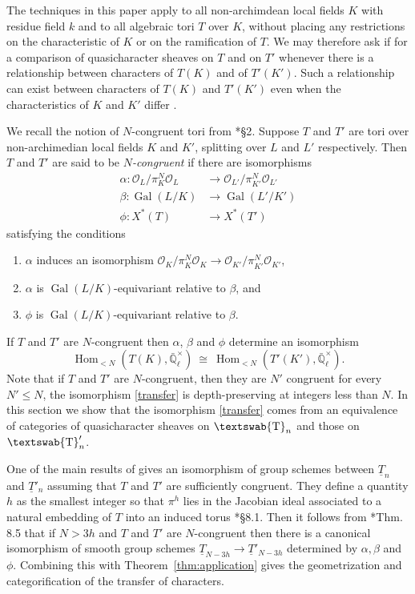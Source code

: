 \documentclass[11pt]{amsart}
\newcommand{\mathswab}[1]{\operatorname{\textswab{#1}}}
\theoremstyle{plain}
\theoremstyle{definition}
\theoremstyle{remark}
\newcommand{\EE}{\mathbb{\bar Q}_\ell}
\newcommand{\OK}{\mathcal{O}_K}
\newcommand{\OL}{\mathcal{O}_L}
\newcommand{\OO}[1]{\mathcal{O}_{#1}}
\newcommand{\EEx}{\EE^\times}
\DeclareMathOperator{\Gal}{Gal}
\DeclareMathOperator{\Hom}{Hom}
\newcommand{\iso}{{\ \cong\ }}
\newcommand{\GN}[1]{\mathswab{#1}}
\newcommand{\TT}{\underline{T}}
\newcommand\Clifton[1]{\marginpar{\smaller\smaller CC: #1}}
\begin{document}
The techniques in this paper apply to all non-archimdean local fields $K$ with residue field $k$
and to all algebraic tori $T$ over $K$, without placing any restrictions on the characteristic of $K$
or on the ramification of $T$. 
\Clifton{Fix this.}
We may therefore ask if for a comparison of
quasicharacter sheaves on $T$ and on $T'$ whenever there is a relationship
between characters of $T(K)$ and of $T'(K')$.
Such a relationship can exist between characters of $T(K)$ and $T'(K')$ even
when the characteristics of $K$ and $K'$ differ
.

We recall the notion of $N$-congruent tori from \cite{chai-yu:01a}*{\S 2}.
Suppose $T$ and $T'$ are tori over non-archimedian local fields $K$ and $K'$,
splitting over $L$ and $L'$ respectively.
Then $T$ and $T'$ are said to be \emph{$N$-congruent} if there are isomorphisms
 \begin{align*}
  \alpha : \OL/\pi_K^N \OL &\to \OO{L'}/\pi_{K'}^N \OO{L'} \\
  \beta : \Gal(L/K) &\to \Gal(L'/K') \\
  \phi : X^*(T) &\to X^*(T')
 \end{align*}
 satisfying the conditions
 \begin{enumerate}
  \item $\alpha$ induces an isomorphism $\OK/\pi_K^N \OK \to \OO{K'}/\pi_{K'}^N \OO{K'}$,
  \item $\alpha$ is $\Gal(L/K)$-equivariant relative to $\beta$, and
  \item $\phi$ is $\Gal(L/K)$-equivariant relative to $\beta$.
 \end{enumerate}
If $T$ and $T'$ are $N$-congruent then $\alpha$, $\beta$ and $\phi$ determine an isomorphism
\begin{equation}\label{transfer}
  \Hom_{<N}(T(K), \EEx) \iso \Hom_{<N}(T'(K'),\EEx).
\end{equation}
Note that if $T$ and $T'$ are $N$-congruent, then they are $N'$ congruent for every
$N' \leq N$, the isomorphism \eqref{transfer} is depth-preserving at integers less than $N$.
In this section we show that the isomorphism \eqref{transfer} comes from an equivalence of
categories of quasicharacter sheaves on $\GN{T}_n$ and those on $\GN{T}'_n$.

One of the main results of \cite{chai-yu:01a} gives an isomorphism of group schemes between
$\TT_n$ and $\TT'_n$ assuming that $T$ and $T'$ are sufficiently congruent.
They define a quantity $h$ as the smallest integer so that $\pi^h$ lies in the
Jacobian ideal associated to a natural embedding of $T$ into an induced torus \cite{chai-yu:01a}*{\S 8.1}.
Then it follows from \cite{chai-yu:01a}*{Thm. 8.5} that if $N > 3h$ and $T$ and $T'$ are $N$-congruent 
then there is a canonical isomorphism of smooth group schemes
 $
  \TT_{N-3h} \to \TT'_{N-3h}
 $
 determined by $\alpha, \beta$ and $\phi$.
Combining this with Theorem~\ref{thm:application} gives the geometrization and categorification of the transfer of characters.
\end{document}
